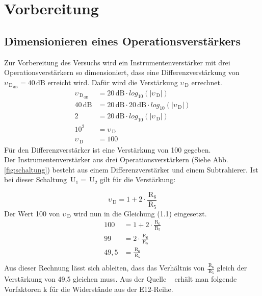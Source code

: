 \chapter{Vorbereitung}
    \section{Dimensionieren eines Operationsverstärkers}
 

Zur Vorbereitung des Versuchs wird ein Instrumentenverstärker mit drei Operationsverstärkern so dimensioniert, dass eine Differenzverstärkung von $\upsilon_{\,\text{D}_{\,\text{dB}}}=40\,\text{dB}$ erreicht wird. Dafür wird die Verstärkung $\upsilon_{\,\text{D}}$ errechnet.
\begin{align*}
\upsilon_{\,\text{D}_{\,\text{dB}}} & = 20\,\text{dB}\cdot log_{10}(|\upsilon_{\,\text{D}}|)\\
40\,\text{dB} & = 20\,\text{dB}\cdot 20\,\text{dB}\cdot log_{10}(|\upsilon_{\,\text{D}}|)\\
2 & = 20\,\text{dB}\cdot log_{10}(|\upsilon_{\,\text{D}}|)\\
10^2 & = \upsilon_{\,\text{D}}\\
\upsilon_{\,\text{D}} & = 100                          
\end{align*}
Für den Differenzverstärker ist eine Verstärkung von 100 gegeben.
\\
Der Instrumentenverstärker aus drei Operationsverstärkern (Siehe Abb. \ref{fig:schaltung}) besteht aus einem Differenzverstärker und einem Subtrahierer. Ist bei dieser Schaltung $\,\text{U}_1=\,\text{U}_2$ gilt für die Verstärkung:

\begin{equation}
\upsilon_{\,\text{D}}=1+2\cdot \frac{\,\text{R}_6}{\,\text{R}_5}
\end{equation}
Der Wert 100 von $\upsilon_{\,\text{D}}$ wird nun in die Gleichung (1.1) eingesetzt.
\begin{align*}
100 & = 1+2\cdot \frac{\,\text{R}_6}{\,\text{R}_5}\\
99 & = 2\cdot \frac{\,\text{R}_6}{\,\text{R}_5}\\
49,5 & = \frac{\,\text{R}_6}{\,\text{R}_5}\\
\end{align*}
Aus dieser Rechnung lässt sich ableiten, dass das Verhältnis von $\frac{\,\text{R}_6}{\,\text{R}_5}$ gleich der Verstärkung von 49,5 gleichen muss. Aus der Quelle ~\cite{wiki} erhält man folgende Vorfaktoren k für die Widerstände aus der E12-Reihe.

